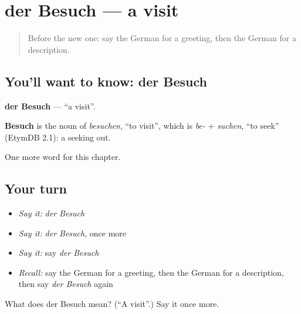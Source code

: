 \section[der Besuch]{der Besuch — a visit}

\label{lesson:GE-C226-besuch}



\begin{quote}
Before the new one: say the German for a greeting, then the German for a description.
\end{quote}

\subsection*{You'll want to know: der Besuch}
\textbf{der Besuch} — \textquotedblleft{}a visit\textquotedblright{}.

\begin{cousinweb}
\textbf{Besuch} is the noun of \emph{besuchen}, \textquotedblleft{}to visit\textquotedblright{}, which is \emph{be-} + \emph{suchen}, \textquotedblleft{}to seek\textquotedblright{} (EtymDB 2.1): a seeking out.
\end{cousinweb}

\begin{grammarlens}[title={What you've built}]
One more word for this chapter.
\end{grammarlens}

\subsection*{Your turn}
\begin{itemize}
\raggedright
  \item \emph{Say it:} \emph{der Besuch}
  \item \emph{Say it:} \emph{der Besuch}, once more
  \item \emph{Say it:} say \emph{der Besuch}
  \item \emph{Recall:} say the German for a greeting, then the German for a description, then say \emph{der Besuch} again
\end{itemize}

\begin{tcolorbox}[breakable,colback=teal!4,colframe=teal!35!black,title={Before you move on}]
What does der Besuch mean? (\textquotedblleft{}A visit\textquotedblright{}.) Say it once more.
\end{tcolorbox}
